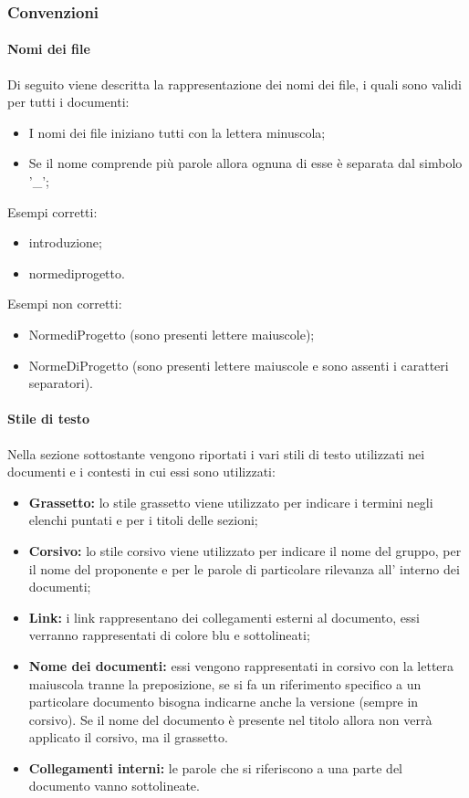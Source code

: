 \subsubsection{Convenzioni}
\paragraph{Nomi dei file}
Di seguito viene descritta la rappresentazione dei nomi dei file, i quali sono validi per tutti i documenti:
\begin{itemize}
    \item I nomi dei file iniziano tutti con la lettera minuscola;
    \item Se il nome comprende più parole allora ognuna di esse è separata dal simbolo '\_';
\end {itemize}
Esempi corretti:
\begin{itemize}
    \item introduzione;
    \item norme\textunderscore di\textunderscore progetto.
\end {itemize}
Esempi non corretti:
\begin{itemize}
    \item Norme\textunderscore di\textunderscore Progetto (sono presenti lettere maiuscole);
    \item NormeDiProgetto (sono presenti lettere maiuscole e sono assenti i caratteri separatori).
\end {itemize}

\paragraph{Stile di testo}
Nella sezione sottostante vengono riportati i vari stili di testo utilizzati nei documenti e i contesti in cui essi sono utilizzati:
\begin {itemize}
    \item \textbf{Grassetto:} lo stile grassetto viene utilizzato per indicare i termini negli elenchi puntati e per i titoli delle sezioni;
    \item \textbf{Corsivo:} lo stile corsivo viene utilizzato per indicare il nome del gruppo, per il nome del proponente e per le parole di particolare rilevanza all' interno dei documenti;
    \item \textbf{Link:} i link rappresentano dei collegamenti esterni al documento, essi verranno rappresentati di colore blu e sottolineati;
    \item \textbf{Nome dei documenti:} essi vengono rappresentati in corsivo con la lettera maiuscola tranne la preposizione, se si fa un riferimento specifico a un particolare documento bisogna indicarne anche la versione (sempre in corsivo).
    Se il nome del documento è presente nel titolo allora non verrà applicato il corsivo, ma il grassetto.
    \item \textbf{Collegamenti interni:} le parole che si riferiscono a una parte del documento vanno sottolineate.
\end {itemize}
